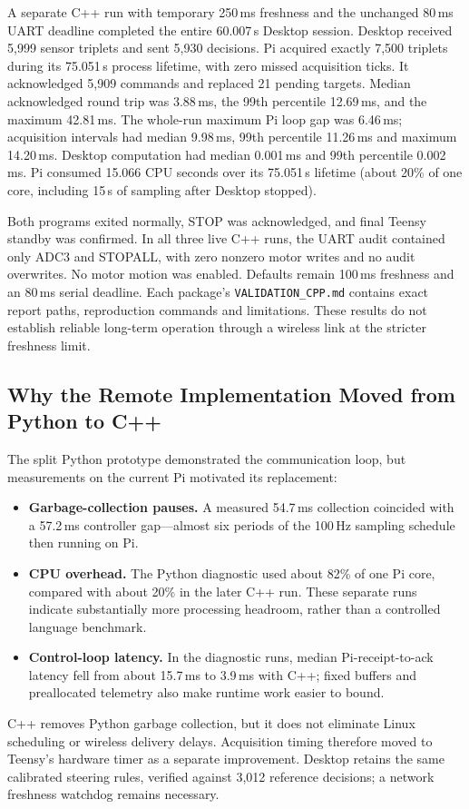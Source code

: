 A separate C++ run with temporary 250\,ms freshness and the unchanged 80\,ms UART deadline completed the entire 60.007\,s Desktop session. Desktop received 5,999 sensor triplets and sent 5,930 decisions. Pi acquired exactly 7,500 triplets during its 75.051\,s process lifetime, with zero missed acquisition ticks. It acknowledged 5,909 commands and replaced 21 pending targets. Median acknowledged round trip was 3.88\,ms, the 99th percentile 12.69\,ms, and the maximum 42.81\,ms. The whole-run maximum Pi loop gap was 6.46\,ms; acquisition intervals had median 9.98\,ms, 99th percentile 11.26\,ms and maximum 14.20\,ms. Desktop computation had median 0.001\,ms and 99th percentile 0.002\,ms. Pi consumed 15.066 CPU seconds over its 75.051\,s lifetime (about 20\% of one core, including 15\,s of sampling after Desktop stopped).

Both programs exited normally, STOP was acknowledged, and final Teensy standby was confirmed. In all three live C++ runs, the UART audit contained only ADC3 and STOPALL, with zero nonzero motor writes and no audit overwrites. No motor motion was enabled. Defaults remain 100\,ms freshness and an 80\,ms serial deadline. Each package's \texttt{VALIDATION\_CPP.md} contains exact report paths, reproduction commands and limitations. These results do not establish reliable long-term operation through a wireless link at the stricter freshness limit.

\subsection{Why the Remote Implementation Moved from Python to C++}
The split Python prototype demonstrated the communication loop, but measurements on the current Pi motivated its replacement:
\begin{itemize}
\item \textbf{Garbage-collection pauses.} A measured 54.7\,ms collection coincided with a 57.2\,ms controller gap---almost six periods of the 100\,Hz sampling schedule then running on Pi.
\item \textbf{CPU overhead.} The Python diagnostic used about 82\% of one Pi core, compared with about 20\% in the later C++ run. These separate runs indicate substantially more processing headroom, rather than a controlled language benchmark.
\item \textbf{Control-loop latency.} In the diagnostic runs, median Pi-receipt-to-ack latency fell from about 15.7\,ms to 3.9\,ms with C++; fixed buffers and preallocated telemetry also make runtime work easier to bound.
\end{itemize}
C++ removes Python garbage collection, but it does not eliminate Linux scheduling or wireless delivery delays. Acquisition timing therefore moved to Teensy's hardware timer as a separate improvement. Desktop retains the same calibrated steering rules, verified against 3,012 reference decisions; a network freshness watchdog remains necessary.
